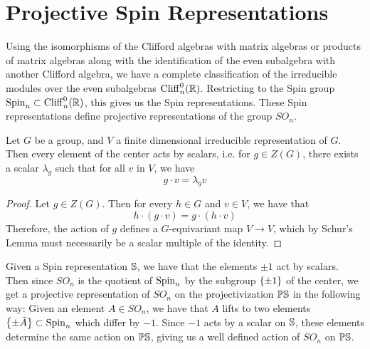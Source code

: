 %
\section{Projective Spin Representations}
%
Using the isomorphisms of the Clifford algebras with matrix algebras
or products of matrix algebras along with the identification of the
even subalgebra with another Clifford algebra, we have a complete classification
of the irreducible modules over the even subalgebras $\Cliff^0_{n}(\R)$.
Restricting to the Spin group $\Spin_n \subset \Cliff^0_n(\R)$, this gives us
the Spin representations. These Spin representations define projective
representations of the group $SO_n$.
%
\begin{prop}
Let $G$ be a group, and $V$ a finite dimensional irreducible representation of $G$.
Then every element of the center acts by scalars, i.e. for $g \in Z(G)$, there
exists a scalar $\lambda_g$ such that for all $v$ in $V$, we have
\[
g \cdot v = \lambda_g v
\]
\end{prop}
%
\begin{proof}
Let $g \in Z(G)$. Then for every $h \in G$ and $v \in V$, we have that
\[
h \cdot (g\cdot v) = g \cdot (h\cdot v)
\]
Therefore, the action of $g$ defines a $G$-equivariant map $V \to V$, which
by Schur's Lemma must necessarily be a scalar multiple of the identity.
\end{proof}
%
Given a Spin representation $\S$, we have that the elements
$\pm 1$ act by scalars. Then since $SO_n$ is the quotient of $\Spin_n$ by the
subgroup $\set{\pm 1}$ of the center, we get a projective representation of
$SO_n$ on the projectivization $\P\S$ in the following way:
Given an element $A \in SO_n$, we have that $A$ lifts to two elements
$\set{\pm \tilde{A}} \subset \Spin_n$ which differ by $-1$. Since $-1$
acts by a scalar on $\S$, these elements determine the same action on
$\P\S$, giving us a well defined action of $SO_n$ on $\P\S$.

